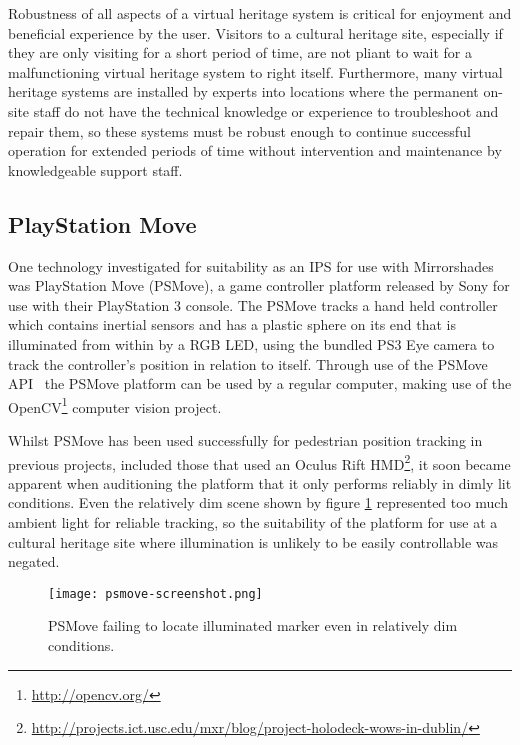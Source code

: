 Robustness of all aspects of a virtual heritage system is critical for enjoyment and beneficial experience by the user. Visitors to a cultural heritage site, especially if they are only visiting for a short period of time, are not pliant to wait for a malfunctioning virtual heritage system to right itself. Furthermore, many virtual heritage systems are installed by experts into locations where the permanent on-site staff do not have the technical knowledge or experience to troubleshoot and repair them, so these systems must be robust enough to continue successful operation for extended periods of time without intervention and maintenance by knowledgeable support staff.



\subsection{PlayStation Move}

One technology investigated for suitability as an IPS for use with Mirrorshades was PlayStation Move (PSMove), a game controller platform released by Sony for use with their PlayStation 3 console. The PSMove tracks a hand held controller which contains inertial sensors and has a plastic sphere on its end that is illuminated from within by a RGB LED, using the bundled PS3 Eye camera to track the controller's position in relation to itself. Through use of the PSMove API~\cite{Perl2012} the PSMove platform can be used by a regular computer, making use of the OpenCV\footnote{\url{http://opencv.org/}} computer vision project.

Whilst PSMove has been used successfully for pedestrian position tracking in previous projects, included those that used an Oculus Rift HMD\footnote{\url{http://projects.ict.usc.edu/mxr/blog/project-holodeck-wows-in-dublin/}}, it soon became apparent when auditioning the platform that it only performs reliably in dimly lit conditions. Even the relatively dim scene shown by figure \ref{psmove-screenshot.png} represented too much ambient light for reliable tracking, so the suitability of the platform for use at a cultural heritage site where illumination is unlikely to be easily controllable was negated.

\begin{figure}[h]
	\begin{center}
		\texttt{[image: psmove-screenshot.png]}
		\caption{PSMove failing to locate illuminated marker even in relatively dim conditions.}
		\label{psmove-screenshot.png}
	\end{center}
\end{figure}

